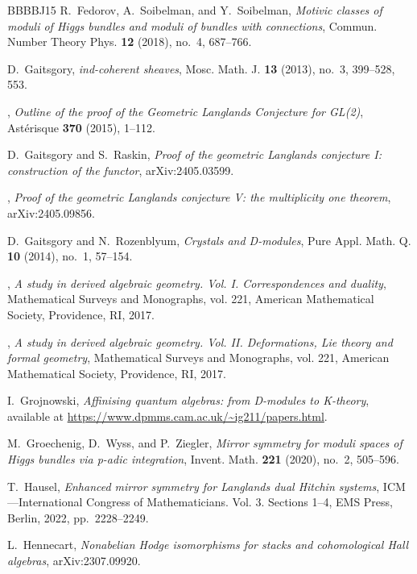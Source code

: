 \documentclass [11pt,oneside,a4paper,mathscr]{amsart}
\theoremstyle{definition}
\begin{document}
\begin{thebibliography}{BBBBJ15}
R.~Fedorov, A.~Soibelman, and Y.~Soibelman, \emph{Motivic classes of moduli of {H}iggs bundles and moduli of bundles with connections}, Commun. Number Theory Phys. \textbf{12} (2018), no.~4, 687--766.

D.~Gaitsgory, \emph{ind-coherent sheaves}, Mosc. Math. J. \textbf{13} (2013), no.~3, 399--528, 553.

\bysame, \emph{Outline of the proof of the {G}eometric {L}anglands {C}onjecture for {GL}(2)}, Ast\'erisque \textbf{370} (2015), 1--112.

D.~Gaitsgory and S.~Raskin, \emph{Proof of the geometric {L}anglands conjecture {I}: construction of the functor}, arXiv:2405.03599.

\bysame, \emph{Proof of the geometric {L}anglands conjecture {V}: the multiplicity one theorem}, arXiv:2405.09856.

D.~Gaitsgory and N.~Rozenblyum, \emph{Crystals and {D}-modules}, Pure Appl. Math. Q. \textbf{10} (2014), no.~1, 57--154.

\bysame, \emph{A study in derived algebraic geometry. {V}ol. {I}. {C}orrespondences and duality}, Mathematical Surveys and Monographs, vol. 221, American Mathematical Society, Providence, RI, 2017.

\bysame, \emph{A study in derived algebraic geometry. {V}ol. {II}. {D}eformations, {L}ie theory and formal geometry}, Mathematical Surveys and Monographs, vol. 221, American Mathematical Society, Providence, RI, 2017.

I.~Grojnowski, \emph{Affinising quantum algebras: from {D}-modules to {K}-theory}, available at \url{https://www.dpmms.cam.ac.uk/~ig211/papers.html}.

M.~Groechenig, D.~Wyss, and P.~Ziegler, \emph{Mirror symmetry for moduli spaces of {H}iggs bundles via p-adic integration}, Invent. Math. \textbf{221} (2020), no.~2, 505--596.

T.~Hausel, \emph{Enhanced mirror symmetry for {L}anglands dual {H}itchin systems}, I{CM}---{I}nternational {C}ongress of {M}athematicians. {V}ol. 3. {S}ections 1--4, EMS Press, Berlin, 2022, pp.~2228--2249.

L.~Hennecart, \emph{Nonabelian {H}odge isomorphisms for stacks and cohomological {H}all algebras}, arXiv:2307.09920.


\end{thebibliography}
\end{document}
